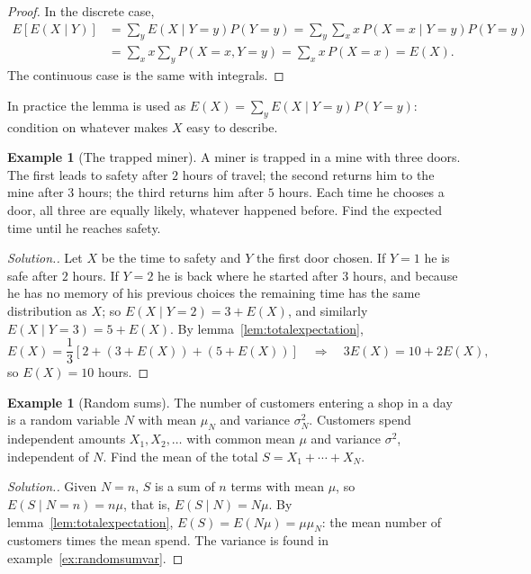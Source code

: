 \documentclass[12pt,a4paper]{report}
\theoremstyle{definition}
\newtheorem{exa}[thm]{Example}
\newenvironment{solution}
  {\renewcommand{\qedsymbol}{}\begin{proof}[\textit{Solution}.]}
  {\end{proof}}
\begin{document}
\begin{proof}
In the discrete case,
\begin{align*}
E\left[E(X\mid Y)\right] &= \sum_yE(X\mid Y = y)P(Y = y) = \sum_y\sum_x x\,P(X = x\mid Y = y)P(Y = y)\\
&= \sum_x x\sum_yP(X = x, Y = y) = \sum_x x\,P(X = x) = E(X).
\end{align*}
The continuous case is the same with integrals.
\end{proof}

In practice the lemma is used as $E(X) = \sum_yE(X\mid Y = y)P(Y = y)$: condition on
whatever makes $X$ easy to describe.

\begin{exa}[The trapped miner]
\label{ex:miner}
A miner is trapped in a mine with three doors. The first leads to safety after $2$ hours
of travel; the second returns him to the mine after $3$ hours; the third returns him
after $5$ hours. Each time he chooses a door, all three are equally likely, whatever
happened before. Find the expected time until he reaches safety.
\end{exa}

\begin{solution}
Let $X$ be the time to safety and $Y$ the first door chosen. If $Y = 1$ he is safe after
$2$ hours. If $Y = 2$ he is back where he started after $3$ hours, and because he has no
memory of his previous choices the remaining time has the same distribution as $X$; so
$E(X\mid Y = 2) = 3 + E(X)$, and similarly $E(X\mid Y = 3) = 5 + E(X)$. By
lemma~\ref{lem:totalexpectation},
\[E(X) = \frac13\left[2 + (3 + E(X)) + (5 + E(X))\right]\quad\Longrightarrow\quad 3E(X) = 10 + 2E(X),\]
so $E(X) = 10$ hours.
\end{solution}

\begin{exa}[Random sums]
\label{ex:randomsum}
The number of customers entering a shop in a day is a random variable $N$ with mean $\mu_N$
and variance $\sigma_N^2$. Customers spend independent amounts $X_1, X_2, \dots$ with common
mean $\mu$ and variance $\sigma^2$, independent of $N$. Find the mean of the total
$S = X_1 + \cdots + X_N$.
\end{exa}

\begin{solution}
Given $N = n$, $S$ is a sum of $n$ terms with mean $\mu$, so $E(S\mid N = n) = n\mu$, that is,
$E(S\mid N) = N\mu$. By lemma~\ref{lem:totalexpectation}, $E(S) = E(N\mu) = \mu\mu_N$: the mean
number of customers times the mean spend. The variance is found in
example~\ref{ex:randomsumvar}.
\end{solution}
\end{document}
